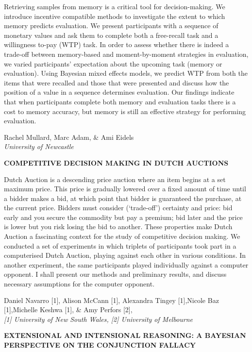 \documentclass[]{article}
\begin{document}
Retrieving samples from memory is a critical tool for decision-making.
We introduce incentive compatible methods to investigate the extent to
which memory predicts evaluation. We present participants with a
sequence of monetary values and ask them to complete both a free-recall
task and a willingness to-pay (WTP) task. In order to assess whether
there is indeed a trade-off between memory-based and moment-by-moment
strategies in evaluation, we varied participants' expectation about the
upcoming task (memory or evaluation). Using Bayesian mixed effects
models, we predict WTP from both the items that were recalled and those
that were presented and discuss how the position of a value in a
sequence determines evaluation. Our findings indicate that when
participants complete both memory and evaluation tasks there is a cost
to memory accuracy, but memory is still an effective strategy for
performing evaluation.\\
\pagebreak  

Rachel Mullard, Marc Adam, \& Ami Eidels\\
\emph{University of Newcastle}

\textbf{COMPETITIVE DECISION MAKING IN DUTCH AUCTIONS}

Dutch Auction is a descending price auction where an item begins at a
set maximum price. This price is gradually lowered over a fixed amount
of time until a bidder makes a bid, at which point that bidder is
guaranteed the purchase, at the current price. Bidders must consider
(`trade-off') certainty and price: bid early and you secure the
commodity but pay a premium; bid later and the price is lower but you
risk losing the bid to another. These properties make Dutch Auction a
fascinating context for the study of competitive decision making. We
conducted a set of experiments in which triplets of participants took
part in a computerised Dutch Auction, playing against each other in
various conditions. In another experiment, the same participants played
individually against a computer opponent. I shall present our methods
and preliminary results, and discuss necessary assumptions for the
computer opponent.\\
\pagebreak  

Daniel Navarro {[}1{]}, Alison McCann {[}1{]}, Alexandra Tingey
{[}1{]},Nicole Baz {[}1{]},Michelle Keshwa {[}1{]}, \& Amy Perfors
{[}2{]},\\
\emph{{[}1{]} University of New South Wales, {[}2{]} University of
Melbourne}

\textbf{EXTENSIONAL AND INTENSIONAL REASONING: A BAYESIAN PERSPECTIVE ON
THE CONJUNCTION FALLACY}
\end{document}
